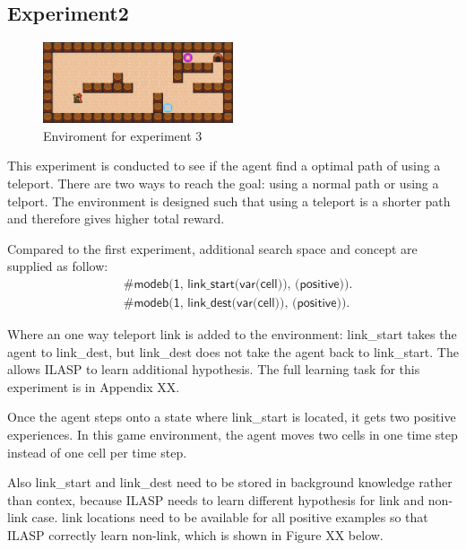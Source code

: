 \newpage
\subsection{Experiment2}

\begin{figure}[!htb]
\centering
\includegraphics[width=0.5\textwidth]{./figures/experiment3}
\caption{Enviroment for experiment 3}
\label{experiment3}
\end{figure}

This experiment is conducted to see if the agent find a optimal path of using a teleport.
There are two ways to reach the goal: using a normal path or using a telport. 
The environment is designed such that using a teleport is a shorter path and therefore gives higher total reward. 

Compared to the first experiment, additional search space and concept are supplied as follow:
\begin{equation*}
\begin{split}
&\textsf{\#modeb(1, link\_start(var(cell)), (positive)).}\\
&\textsf{\#modeb(1, link\_dest(var(cell)), (positive)).}
\end{split}
\end{equation*}

Where an one way teleport link is added to the environment: link\_start takes the agent to link\_dest, but link\_dest does not take the agent back to link\_start.
The allows ILASP to learn additional hypothesis.
The full learning task for this experiment is in Appendix XX.

Once the agent steps onto a state where link\_start is located, it gets two positive experiences. 
In this game environment, the agent moves two cells in one time step instead of one cell per time step.


Also link\_start and link\_dest need to be stored in background knowledge rather than contex, 
because ILASP needs to learn different hypothesis for link and non-link case. 
link locations need to be available for all positive examples so that ILASP correctly learn non-link, which is shown in Figure XX below.

